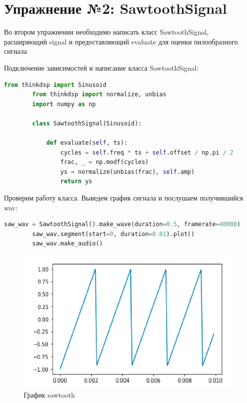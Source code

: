 \documentclass[a4paper, 14pt]{extarticle}
\begin{document}
    \newpage


    \section{Упражнение №2: SawtoothSignal}
    \label{sec:2_sawtooth_signal}

    Во втором упражнении необходимо написать класс SawtoothSignal, расширяющий signal и предоставляющий evaluate для оценки пилообразного сигнала

    Подключение зависимостей и написание класса SawtoothSignal:

    \begin{lstlisting}[language=Python, caption= Класс SawtoothSignal, label={lst:sawtooth_code}]
        from thinkdsp import Sinusoid
        from thinkdsp import normalize, unbias
        import numpy as np

        class SawtoothSignal(Sinusoid):

            def evaluate(self, ts):
                cycles = self.freq * ts + self.offset / np.pi / 2
                frac, _ = np.modf(cycles)
                ys = normalize(unbias(frac), self.amp)
                return ys

    \end{lstlisting}

    Проверим работу класса.
    Выведем график сигнала и послушаем получившийся wav:

    \begin{lstlisting}[language=Python, caption= Вывод графика и создание wav, label={lst:create_wav_plot}]
        saw_wav = SawtoothSignal().make_wave(duration=0.5, framerate=40000)
        saw_wav.segment(start=0, duration=0.01).plot()
        saw_wav.make_audio()

    \end{lstlisting}

    \begin{figure}[H]
        \centering
        \includegraphics[width=\textwidth]{sawtooth_plot}
        \caption{График sawtooth}
        \label{fig:sawtooth_plot}
    \end{figure}
\end{document}
